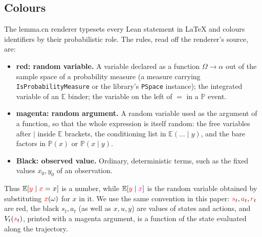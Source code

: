 \documentclass[11pt,a4paper]{article}
\newcommand{\E}{\mathbb{E}}
\newcommand{\Prb}{\mathbb{P}}
\newcommand{\rv}[1]{{\color{red}#1}}       %
\newcommand{\ra}[1]{{\color{magenta}#1}}   %
\newcommand{\sv}{\rv{s}}
\newcommand{\av}{\rv{a}}
\newcommand{\rw}{\rv{r}}
\begin{document}
\subsection{Colours}
The lemma.cn renderer typesets every Lean statement in \LaTeX{} and colours identifiers by their probabilistic role.
The rules, read off the renderer's source, are:
\begin{itemize}[leftmargin=1.6em,itemsep=0.2em]
  \item \textbf{\rv{red}: random variable.} A variable declared as a function $\Omega\to\alpha$ out of the sample space of a probability measure (a measure carrying \texttt{IsProbabilityMeasure} or the library's \texttt{PSpace} instance); the integrated variable of an $\E$ binder; the variable on the left of $=$ in a $\Prb$ event.
  \item \textbf{\ra{magenta}: random argument.} A random variable used as the argument of a function, so that the whole expression is itself random: the free variables after $\mid$ inside $\E$ brackets, the conditioning list in $\E(\ldots\mid y)$, and the bare factors in $\Prb(x)$ or $\Prb(x\mid y)$.
  \item \textbf{Black: observed value.} Ordinary, deterministic terms, such as the fixed values $x_0,y_0$ of an observation.
\end{itemize}
Thus $\E[\rv{y}\mid\rv{x}=x]$ is a number, while $\E[\rv{y}\mid\ra{x}]$ is the random variable obtained by substituting $\rv{x}(\omega)$ for $x$ in it.
We use the same convention in this paper: $\sv_t,\av_t,\rw_t$ are red, the black $s_t,a_t$ (as well as $x,u,y$) are values of states and actions, and $V_t(\ra{s}_t)$, printed with a magenta argument, is a function of the state evaluated along the trajectory.
\end{document}
